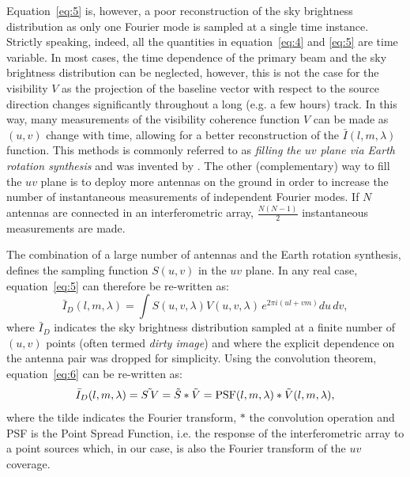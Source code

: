 Equation~\ref{eq:5} is, however, a poor reconstruction of the sky brightness distribution as only one Fourier mode is sampled at a single time instance. Strictly speaking, indeed, all the quantities in equation~\ref{eq:4} and \ref{eq:5} are time variable. In most cases, the time dependence of the primary beam and the sky brightness distribution can be neglected, however, this is not the case for the visibility $V$ as the projection of the baseline vector with respect to the source direction changes significantly throughout a long (e.g. a few hours) track. In this way, many measurements of the visibility coherence function $V$ can be made as $(u,v)$ change with time, allowing for a better reconstruction of the ${\bar I} (l, m, \lambda)$ function. This methods is commonly referred to as {\it filling the $uv$ plane via Earth rotation synthesis} and was invented by \cite{ryle60}. The other (complementary) way to fill the $uv$ plane is to deploy more antennas on the ground in order to increase the number of instantaneous measurements of independent Fourier modes. If $N$ antennas are connected in an interferometric array, $\frac{N (N - 1)}{2}$ instantaneous measurements are made. 

The combination of a large number of antennas and the Earth rotation synthesis, defines the sampling function $S(u,v)$ in the $uv$ plane. In any real case, equation~\ref{eq:5} can therefore be re-written as:
\begin{equation}
{\bar I}_D (l, m, \lambda) = \int S(u,v, \lambda) V (u,v, \lambda) \, e^{2 \pi i (ul + vm)} du \, dv,
\label{eq:6}
\end{equation}
where ${\bar I}_D$ indicates the sky brightness distribution sampled at a finite number of $(u,v)$ points (often termed {\it dirty image}) and where the explicit dependence on the antenna pair was dropped for simplicity. Using the convolution theorem, equation~\ref{eq:6} can be re-written as:
\begin{equation}
{\bar I}_D (l, m, \lambda)  =  \tilde{S \, V} =  {\tilde S} \ast {\tilde V} = {\rm PSF} (l, m, \lambda) \ast {\tilde V} (l, m, \lambda),
\label{eq:7}
\end{equation}
where the tilde indicates the Fourier transform, $\ast$ the convolution operation and PSF is the Point Spread Function, i.e. the response of the interferometric array to a point sources which, in our case, is also the Fourier transform of the $uv$ coverage.

